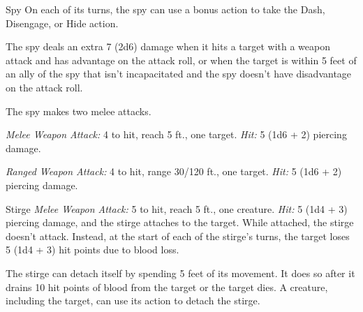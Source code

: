 \documentclass[10pt,a4paper,twoside,bg=print,twocolumn,openany,nodeprecatedcode]{dndbook}
\begin{document}
\begin{DndMonster}[float=t]{Spy}
\DndMonsterBasics[
armor-class = {12},
hit-points = {\DndDice{6d8}},
speed = {30 ft.}
]
\DndMonsterAbilityScores[
 str = 10,
 dex = 15,
 con = 10,
 int = 12,
 wis = 14,
 cha = 16
]
\DndMonsterDetails[
skills = {Deception +5, Insight +4, Investigation +5, Perception +6, Persuasion +5, Sleight Of Hand +4, Stealth +4},
languages = {any two languages},
challenge = 1,
]
On each of its turns, the spy can use a bonus action to take the Dash, Disengage, or Hide action.

The spy deals an extra 7 (2d6) damage when it hits a target with a weapon attack and has advantage on the attack roll, or when the target is within 5 feet of an ally of the spy that isn't incapacitated and the spy doesn't have disadvantage on the attack roll.

The spy makes two melee attacks.

\textsl{Melee Weapon Attack:} 4 to hit, reach 5 ft., one target. \textsl{Hit:} 5 (1d6 + 2) piercing damage.

\textsl{Ranged Weapon Attack:} 4 to hit, range 30/120 ft., one target. \textsl{Hit:} 5 (1d6 + 2) piercing damage.

\end{DndMonster}



\begin{DndMonster}[float=t]{Stirge}
\DndMonsterBasics[
armor-class = {14 (natural armor)},
hit-points = {\DndDice{1d4}},
speed = {10 ft., fly 40 ft.}
]
\DndMonsterAbilityScores[
 str = 4,
 dex = 16,
 con = 11,
 int = 2,
 wis = 8,
 cha = 6
]
\DndMonsterDetails[
senses = {darkvision 60 ft., passive perception 9},
challenge = 1/8,
]
\textsl{Melee Weapon Attack:} 5 to hit, reach 5 ft., one creature. \textsl{Hit:} 5 (1d4 + 3) piercing damage, and the stirge attaches to the target. While attached, the stirge doesn't attack. Instead, at the start of each of the stirge's turns, the target loses 5 (1d4 + 3) hit points due to blood loss.

The stirge can detach itself by spending 5 feet of its movement. It does so after it drains 10 hit points of blood from the target or the target dies. A creature, including the target, can use its action to detach the stirge.

\end{DndMonster}
\end{document}
